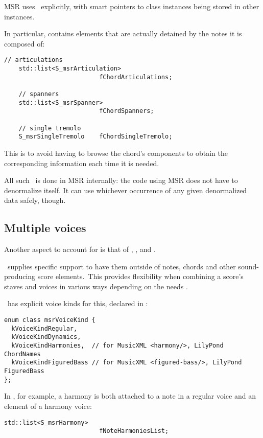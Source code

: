 MSR uses \denorm\ explicitly, with smart pointers to class instances being stored in other instances.

In particular,  contains elements that are actually detained by the notes it is composed of:
\begin{lstlisting}[language=CPlusPlus]
    // articulations
    std::list<S_msrArticulation>
                          fChordArticulations;

    // spanners
    std::list<S_msrSpanner>
                          fChordSpanners;

    // single tremolo
    S_msrSingleTremolo    fChordSingleTremolo;
\end{lstlisting}

This is to avoid having to browse the chord's components to obtain the corresponding information each time it is needed.

All such \denorm\ is done in MSR internally: the code using MSR does not have to denormalize itself.
It can use whichever occurrence of any given denormalized data safely, though.


\subsection{Multiple voices}

Another aspect to account for is that of , ,  and .

\lily\ supplies specific support to have them outside of notes, chords and other sound-producing score elements.\
This provides flexibility when combining a score's staves and voices in various ways depending on the needs .

\mf\ has explicit voice kinds for this, declared in :
\begin{lstlisting}[language=CPlusPlus]
enum class msrVoiceKind {
  kVoiceKindRegular,
  kVoiceKindDynamics,
  kVoiceKindHarmonies,  // for MusicXML <harmony/>, LilyPond ChordNames
  kVoiceKindFiguredBass // for MusicXML <figured-bass/>, LilyPond FiguredBass
};
\end{lstlisting}

In \msrRepr, for example, a harmony is both attached to a note in a regular voice and an element of a harmony voice:
\begin{lstlisting}[language=CPlusPlus]
    std::list<S_msrHarmony>
                          fNoteHarmoniesList;
\end{lstlisting}

